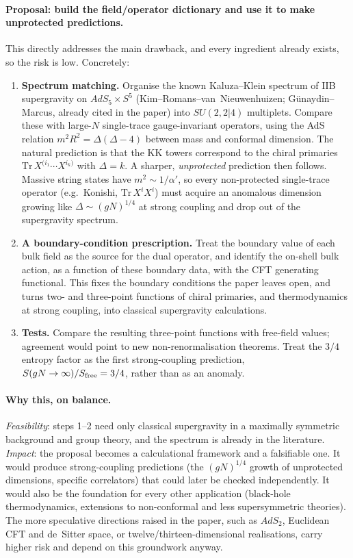 \documentclass[11pt,a4paper]{article}
\begin{document}
\paragraph{Proposal: build the field/operator dictionary and use it to make unprotected predictions.}
This directly addresses the main drawback, and every ingredient already exists, so the risk is low. Concretely:
\begin{enumerate}
\item \textbf{Spectrum matching.} Organise the known Kaluza--Klein spectrum of IIB supergravity on $AdS_5\times S^5$ (Kim--Romans--van~Nieuwenhuizen; G\"unaydin--Marcus, already cited in the paper) into $SU(2,2|4)$ multiplets. Compare these with large-$N$ single-trace gauge-invariant operators, using the AdS relation $m^2R^2=\Delta(\Delta-4)$ between mass and conformal dimension. The natural prediction is that the KK towers correspond to the chiral primaries $\mathrm{Tr}\,X^{(i_1}\cdots X^{i_k)}$ with $\Delta=k$. A sharper, \emph{unprotected} prediction then follows. Massive string states have $m^2\sim1/\alpha'$, so every non-protected single-trace operator (e.g.\ Konishi, $\mathrm{Tr}\,X^iX^i$) must acquire an anomalous dimension growing like $\Delta\sim(gN)^{1/4}$ at strong coupling and drop out of the supergravity spectrum.
\item \textbf{A boundary-condition prescription.} Treat the boundary value of each bulk field as the source for the dual operator, and identify the on-shell bulk action, as a function of these boundary data, with the CFT generating functional. This fixes the boundary conditions the paper leaves open, and turns two- and three-point functions of chiral primaries, and thermodynamics at strong coupling, into classical supergravity calculations.
\item \textbf{Tests.} Compare the resulting three-point functions with free-field values; agreement would point to new non-renormalisation theorems. Treat the $3/4$ entropy factor as the first strong-coupling prediction, $S(gN\to\infty)/S_{\rm free}=3/4$, rather than as an anomaly.
\end{enumerate}

\paragraph{Why this, on balance.}
\emph{Feasibility}: steps 1--2 need only classical supergravity in a maximally symmetric background and group theory, and the spectrum is already in the literature. \emph{Impact}: the proposal becomes a calculational framework and a falsifiable one. It would produce strong-coupling predictions (the $(gN)^{1/4}$ growth of unprotected dimensions, specific correlators) that could later be checked independently. It would also be the foundation for every other application (black-hole thermodynamics, extensions to non-conformal and less supersymmetric theories). The more speculative directions raised in the paper, such as $AdS_2$, Euclidean CFT and de~Sitter space, or twelve/thirteen-dimensional realisations, carry higher risk and depend on this groundwork anyway.
\end{document}
